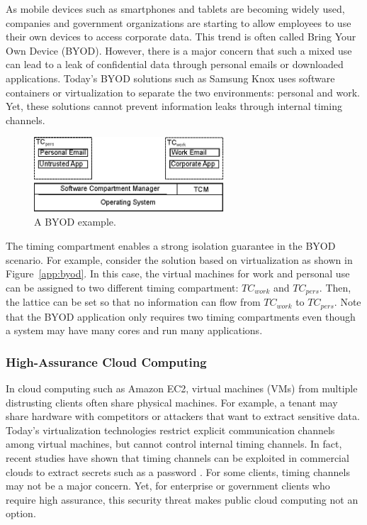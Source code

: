 As mobile devices such as smartphones and tablets are becoming widely used, 
companies and government organizations are starting to allow employees to
use their own devices to access corporate data. This trend is often called
Bring Your Own Device (BYOD). However, there is a major concern that such a
mixed use can lead to a leak of confidential data through personal emails or
downloaded applications. Today's BYOD solutions such as Samsung Knox uses
software containers or virtualization to separate the two environments:
personal and work. Yet, these solutions cannot prevent information leaks
through internal timing channels.

\begin{figure}
    \begin{center}
        \includegraphics[width=2.79in]{figs/byod.eps}
        \caption{A BYOD example.}
        \label{fig:byod}
    \end{center}
\end{figure}

The timing compartment enables a strong isolation guarantee in the BYOD
scenario. For example, consider the solution based on virtualization as 
shown in Figure~\ref{app:byod}. In this case, the virtual machines for
work and personal use can be assigned to two different timing compartment:
$TC_{work}$ and $TC_{pers}$. Then, the lattice can be set so that no
information can flow from $TC_{work}$ to $TC_{pers}$.
Note that the BYOD application only requires two timing compartments even
though a system may have many cores and run many applications.

\subsubsection{High-Assurance Cloud Computing}

In cloud computing such as Amazon EC2, virtual machines (VMs) from multiple
distrusting clients often share physical machines. 
For example, a tenant may share hardware with competitors or attackers that 
want to extract sensitive data. Today's virtualization technologies restrict 
explicit communication channels among virtual machines, but cannot control 
internal timing channels. In fact, recent studies have shown that timing channels
can be exploited in commercial clouds to extract secrets such as 
a password \cite{heyyou}.
For some clients, timing channels may not be a major concern. Yet, for enterprise
or government clients who require high assurance, this security threat makes
public cloud computing not an option. 

